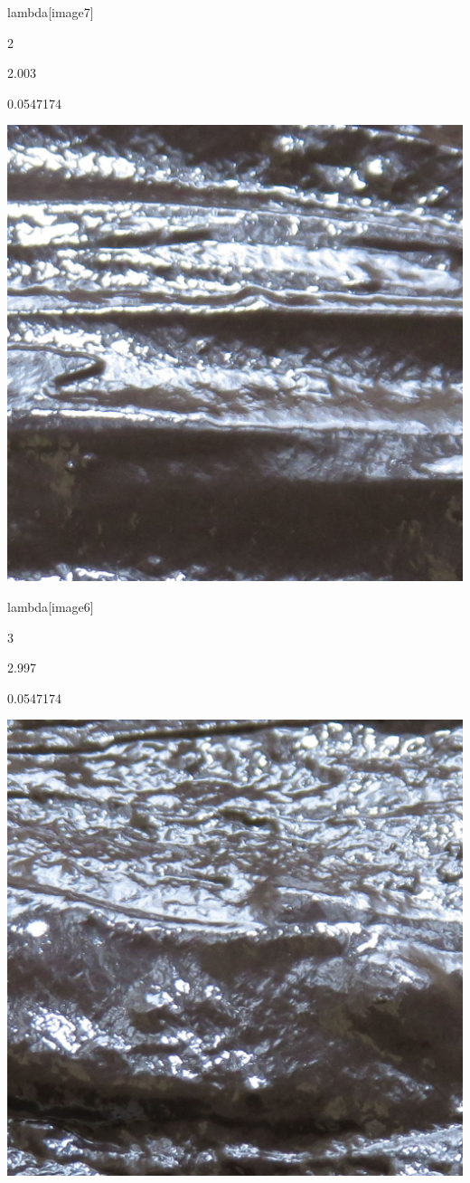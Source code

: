 \documentclass[
]{book}
\begin{document}
lambda{[}image7{]}

2

2.003

0.0547174

\includegraphics{data/moisture/Stimuli/image07.jpg}

lambda{[}image6{]}

3

2.997

0.0547174

\includegraphics{data/moisture/Stimuli/image06.jpg}
\end{document}
